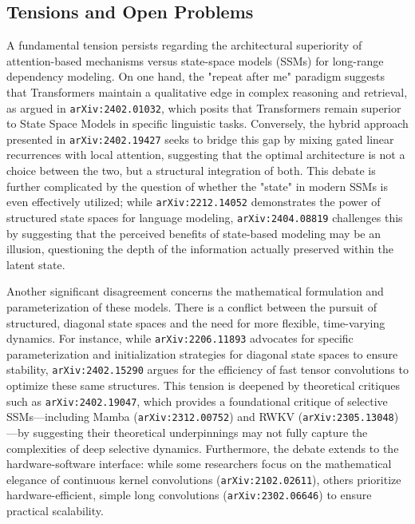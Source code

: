 \documentclass[11pt]{article}
\begin{document}
\subsection{Tensions and Open Problems}

A fundamental tension persists regarding the architectural superiority of attention-based mechanisms versus state-space models (SSMs) for long-range dependency modeling. On one hand, the "repeat after me" paradigm suggests that Transformers maintain a qualitative edge in complex reasoning and retrieval, as argued in \texttt{arXiv:2402.01032}, which posits that Transformers remain superior to State Space Models in specific linguistic tasks. Conversely, the hybrid approach presented in \texttt{arXiv:2402.19427} seeks to bridge this gap by mixing gated linear recurrences with local attention, suggesting that the optimal architecture is not a choice between the two, but a structural integration of both. This debate is further complicated by the question of whether the "state" in modern SSMs is even effectively utilized; while \texttt{arXiv:2212.14052} demonstrates the power of structured state spaces for language modeling, \texttt{arXiv:2404.08819} challenges this by suggesting that the perceived benefits of state-based modeling may be an illusion, questioning the depth of the information actually preserved within the latent state.

Another significant disagreement concerns the mathematical formulation and parameterization of these models. There is a conflict between the pursuit of structured, diagonal state spaces and the need for more flexible, time-varying dynamics. For instance, while \texttt{arXiv:2206.11893} advocates for specific parameterization and initialization strategies for diagonal state spaces to ensure stability, \texttt{arXiv:2402.15290} argues for the efficiency of fast tensor convolutions to optimize these same structures. This tension is deepened by theoretical critiques such as \texttt{arXiv:2402.19047}, which provides a foundational critique of selective SSMs—including Mamba (\texttt{arXiv:2312.00752}) and RWKV (\texttt{arXiv:2305.13048})—by suggesting their theoretical underpinnings may not fully capture the complexities of deep selective dynamics. Furthermore, the debate extends to the hardware-software interface: while some researchers focus on the mathematical elegance of continuous kernel convolutions (\texttt{arXiv:2102.02611}), others prioritize hardware-efficient, simple long convolutions (\texttt{arXiv:2302.06646}) to ensure practical scalability.
\end{document}
